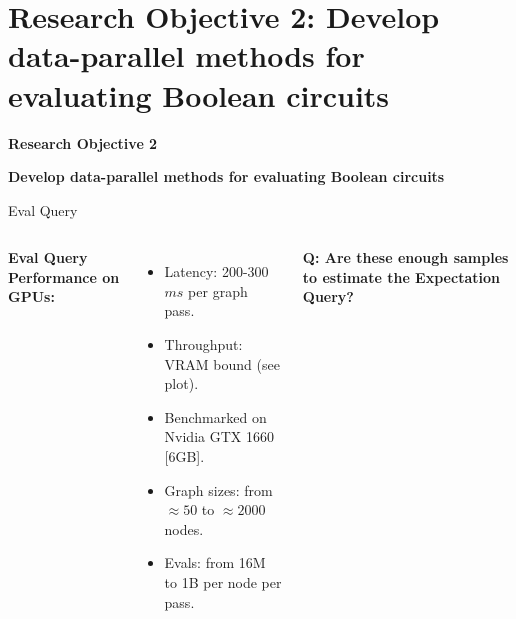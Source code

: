 \section{Research Objective 2: Develop data-parallel methods for evaluating Boolean circuits}
\begin{frame}
    \Large{\centerline{\textbf{Research Objective 2}}}
    \vspace{6pt}
    \large{\centerline{\textbf{Develop data-parallel methods for evaluating Boolean circuits}}}
\end{frame}






\begin{frame}{Eval Query}
  \begin{columns}
    {
      \textbf{Eval Query Performance on GPUs:}
      \begin{itemize}
          \item {Latency: 200-300 $ms$ per graph pass.}
          \item {Throughput: VRAM bound (see plot).}
          \item {Benchmarked on Nvidia GTX 1660 [6GB].}
          \item {Graph sizes: from $\approx 50$ to $\approx 2000$ nodes.}
          \item {Evals: from 16M to 1B per node per pass.}
      \end{itemize}
      \vspace{10pt}
      \textbf{Q: Are these enough samples to estimate the Expectation Query?}
    }
        \centering
        
  \end{columns}
\end{frame}



